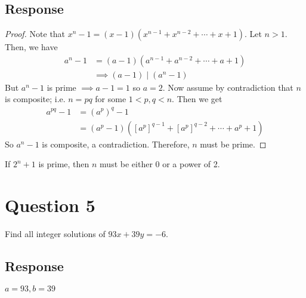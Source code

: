 \documentclass[13pt]{article}
\begin{document}
\subsection*{Response}
\begin{proof}
Note that $x^n - 1 = (x - 1)(x^{n - 1} + x^{n - 2} + \cdots + x + 1)$.
\newline
\newline
Let $n > 1$. Then, we have
\begin{align*}
  a^n - 1 &= (a - 1)(a^{n - 1} + a^{n - 2} + \cdots + a + 1) \\
          &\implies (a - 1) \mid (a^n - 1)
\end{align*}
But $a^n - 1$ is prime $\implies a - 1 = 1$ so $a = 2$.
\newline
\newline
Now assume by contradiction that $n$ is composite; i.e. $n = pq$ for some $1 < p,q < n$. Then we get
\begin{align*}
  a^{pq} - 1 &= (a^p)^q - 1 \\
             &= (a^p - 1)([a^p]^{q - 1} + [a^p]^{q - 2} + \cdots + a^p + 1)
\end{align*}
So $a^n - 1$ is composite, a contradiction. Therefore, $n$ must be prime.
\end{proof}

If $2^n + 1$ is prime, then $n$ must be either 0 or a power of 2.





\newpage
\section*{Question 5}
Find all integer solutions of $93x + 39y = -6$.

\subsection*{Response}
$a = 93, b = 39$
\end{document}
